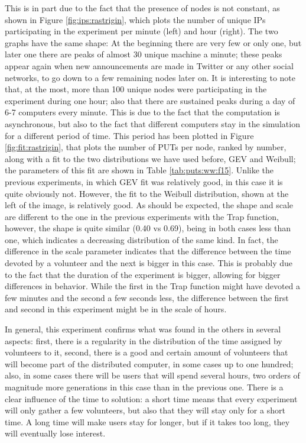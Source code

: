 \documentclass{sig-alternate}
\begin{document}
This is in part due to the fact that the presence of nodes is not
constant, as shown in Figure \ref{fig:ips:rastrigin}, which plots the
number of unique IPs participating in the experiment per minute (left)
and hour (right). The two graphs have the same shape: At the beginning there are very few or only
one, but later one there are peaks of almost 30 unique machine a
minute; these peaks appear again when new announcements are made in
Twitter or any other social networks, to go down to a few remaining
nodes later on. It is interesting to note that, at the most, more than
100 unique nodes were participating in the experiment during one hour;
also that there are sustained peaks during a day of 6-7 computers
every minute. This is due to the fact that the computation is
asynchronous, but also to the fact that different computers stay in
the simulation for a different period of time. This period has been
plotted in Figure \ref{fig:fit:rastrigin}, that plots the number of
PUTs per node, ranked by number, along with a fit to the two
distributions we have used before, GEV and Weibull; the parameters of
this fit are shown in Table \ref{tab:puts:ww:f15}. Unlike the previous
experiments, in which GEV fit was relatively good, in this case it is
quite obviously not. However, the fit to the Weibull distribution,
shown at the left of the image, is relatively good. As should be
expected, the shape and scale are different to the one in the previous
experiments with the Trap function, however, the shape is quite
similar (0.40 vs 0.69), being in both cases less than one, which
indicates a decreasing distribution of the same kind. In fact, the
difference in the scale parameter indicates that the difference
between the time devoted by a volunteer and the next is bigger in this
case. This is probably due to the fact that the duration of the
experiment is bigger, allowing for bigger differences in
behavior. While the first in the Trap function might have devoted a
few minutes and the second a few seconds less, the difference between
the first and second in this experiment might be in the scale of
hours. 


In general, this experiment confirms what was found in the others in
several aspects: first, there is a regularity in the distribution of the
time assigned by volunteers to it, second, there is a good and certain
amount of volunteers that will become part of the distributed
computer, in some cases up to one hundred; also, in some cases there
will be users that will spend several hours, two orders of magnitude
more generations in this case than in the previous one. There is a
clear influence of the time to solution: a short time means that every
experiment will only gather a few volunteers, but also that they will
stay only for a short time. A long time will make users stay for
longer, but if it takes too long, they will eventually lose interest. 
\end{document}
